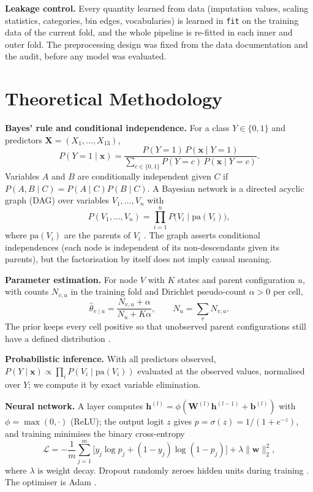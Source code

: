 \documentclass[conference]{IEEEtran}
\begin{document}
\textbf{Leakage control.} Every quantity learned from data (imputation values, scaling statistics, categories, bin edges, vocabularies) is learned in \texttt{fit} on the training data of the current fold, and the whole pipeline is re-fitted in each inner and outer fold. The preprocessing design was fixed from the data documentation and the audit, before any model was evaluated.

\section{Theoretical Methodology}
\label{sec:theory}
\textbf{Bayes' rule and conditional independence.} For a class $Y\in\{0,1\}$ and predictors $\mathbf X=(X_1,\dots,X_{13})$,
\begin{equation}
P(Y=1\mid\mathbf x)=\frac{P(Y=1)\,P(\mathbf x\mid Y=1)}{\sum_{c\in\{0,1\}}P(Y=c)\,P(\mathbf x\mid Y=c)}.
\end{equation}
Variables $A$ and $B$ are conditionally independent given $C$ if $P(A,B\mid C)=P(A\mid C)P(B\mid C)$. A Bayesian network is a directed acyclic graph (DAG) over variables $V_1,\dots,V_n$ with
\begin{equation}
P(V_1,\dots,V_n)=\prod_{i=1}^{n}P\bigl(V_i\mid \mathrm{pa}(V_i)\bigr),
\end{equation}
where $\mathrm{pa}(V_i)$ are the parents of $V_i$ \cite{pearl1988,koller2009}. The graph asserts conditional independences (each node is independent of its non-descendants given its parents), but the factorisation by itself does not imply causal meaning.

\textbf{Parameter estimation.} For node $V$ with $K$ states and parent configuration $u$, with counts $N_{v,u}$ in the training fold and Dirichlet pseudo-count $\alpha>0$ per cell,
\begin{equation}
\hat\theta_{v\mid u}=\frac{N_{v,u}+\alpha}{N_u+K\alpha},\qquad N_u=\sum_{v}N_{v,u}.
\end{equation}
The prior keeps every cell positive so that unobserved parent configurations still have a defined distribution \cite{heckerman1995}.

\textbf{Probabilistic inference.} With all predictors observed, $P(Y\mid\mathbf x)\propto\prod_i P(V_i\mid\mathrm{pa}(V_i))$ evaluated at the observed values, normalised over $Y$; we compute it by exact variable elimination.

\textbf{Neural network.} A layer computes $\mathbf h^{(l)}=\phi(\mathbf W^{(l)}\mathbf h^{(l-1)}+\mathbf b^{(l)})$ with $\phi=\max(0,\cdot)$ (ReLU); the output logit $z$ gives $p=\sigma(z)=1/(1+e^{-z})$, and training minimises the binary cross-entropy
\begin{equation}
\mathcal L=-\frac1m\sum_{j=1}^m\bigl[y_j\log p_j+(1-y_j)\log(1-p_j)\bigr]+\lambda\lVert\mathbf w\rVert_2^2 ,
\end{equation}
where $\lambda$ is weight decay. Dropout randomly zeroes hidden units during training \cite{srivastava2014}. The optimiser is Adam \cite{kingma2015}.
\end{document}
